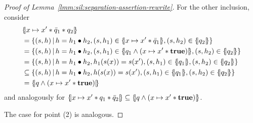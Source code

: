 \begin{proof}[Proof of Lemma~\ref{lmm:sil:separation-assertion-rewrite}]
	For the other inclusion, consider
	\begin{align*}
		 & \asldenot{x \mapsto x' \andsep \bar{q}_1 \andsep q_2}                                                                                            \\
		 & = \lbrace (s, h) \svert h = h_1 \bullet h_2, (s, h_1) \in \asldenot{x \mapsto x' \andsep \bar{q}_1}, (s, h_2) \in \asldenot{q_2} \rbrace         \\
		 & = \lbrace (s, h) \svert h = h_1 \bullet h_2, (s, h_1) \in \asldenot{q_1 \land (x \mapsto x' \andsep \true)}, (s, h_2) \in \asldenot{q_2} \rbrace \\
		 & = \lbrace (s, h) \svert h = h_1 \bullet h_2, h_1(s(x)) = s(x'), (s, h_1) \in \asldenot{q_1}, (s, h_2) \in \asldenot{q_2} \rbrace                 \\
		 & \subseteq \lbrace (s, h) \svert h = h_1 \bullet h_2, h(s(x)) = s(x'), (s, h_1) \in \asldenot{q_1}, (s, h_2) \in \asldenot{q_2} \rbrace           \\
		 & = \asldenot{q \land (x \mapsto x' \andsep \true)}
	\end{align*}
	and analogously for $\{\hspace{-2pt}|x \mapsto x' * q_1 * \bar{q}_2|\hspace{-2pt}\} \subseteq \{\hspace{-2pt}|q \land (x \mapsto x' * \textbf{true})|\hspace{-2pt}\}$.

	The case for point (2) is analogous.
\end{proof}

